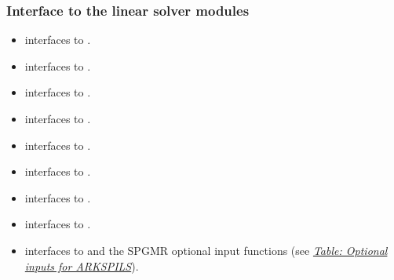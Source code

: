 \documentclass[letterpaper,10pt,english]{sphinxmanual}
\begin{document}
\subsubsection{Interface to the linear solver modules}
\label{f_interface/Routines:interface-to-the-linear-solver-modules}\begin{itemize}
\item {} 
{\hyperref[f_interface/Usage:f/_/FARKDENSE]{}} interfaces to {\hyperref[c_interface/User_callable:ARKDense]{}}.

\item {} 
{\hyperref[f_interface/Usage:f/_/FARKLAPACKDENSE]{}} interfaces to {\hyperref[c_interface/User_callable:ARKLapackDense]{}}.

\item {} 
{\hyperref[f_interface/Usage:f/_/FARKDENSESETJAC]{}} interfaces to {\hyperref[c_interface/User_callable:ARKDlsSetDenseJacFn]{}}.

\item {} 
{\hyperref[f_interface/Usage:f/_/FARKBAND]{}} interfaces to {\hyperref[c_interface/User_callable:ARKBand]{}}.

\item {} 
{\hyperref[f_interface/Usage:f/_/FARKLAPACKBAND]{}} interfaces to {\hyperref[c_interface/User_callable:ARKLapackBand]{}}.

\item {} 
{\hyperref[f_interface/Usage:f/_/FARKBANDSETJAC]{}} interfaces to {\hyperref[c_interface/User_callable:ARKDlsSetBandJacFn]{}}.

\item {} 
{\hyperref[f_interface/Usage:f/_/FARKKLU]{}} interfaces to {\hyperref[c_interface/User_callable:ARKKLU]{}}.

\item {} 
{\hyperref[f_interface/Usage:f/_/FARKSUPERLUMT]{}} interfaces to {\hyperref[c_interface/User_callable:ARKSuperLUMT]{}}.

\item {} 
{\hyperref[f_interface/Usage:f/_/FARKSPGMR]{}} interfaces to {\hyperref[c_interface/User_callable:ARKSpgmr]{}} and the SPGMR optional input
functions (see {\hyperref[c_interface/User_callable:cinterface-arkspilsinputtable]{\emph{Table: Optional inputs for ARKSPILS}}}).


\end{itemize}
\end{document}
